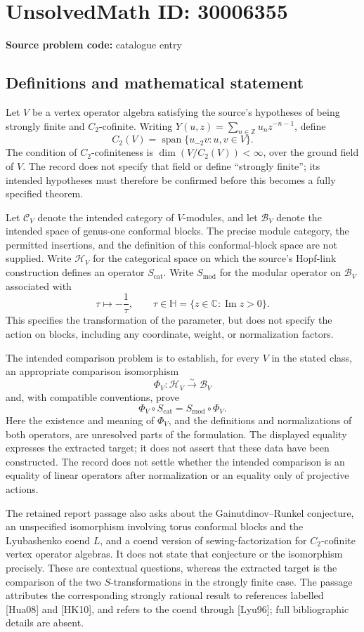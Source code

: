 \documentclass[11pt]{article}
\newcommand{\Z}{\mathbb{Z}}
\newcommand{\C}{\mathbb{C}}
\begin{document}
\section*{UnsolvedMath ID: 30006355}
\textbf{Source problem code:} catalogue entry
\subsection{Definitions and mathematical statement}
Let \(V\) be a vertex operator algebra satisfying the source's hypotheses of being strongly finite and \(C_2\)-cofinite. Writing \(Y(u,z)=\sum_{n\in\Z}u_nz^{-n-1}\), define
\[
C_2(V)=\operatorname{span}\{u_{-2}v:u,v\in V\}.
\]
The condition of \(C_2\)-cofiniteness is \(\dim(V/C_2(V))<\infty\), over the ground field of \(V\). The record does not specify that field or define ``strongly finite''; its intended hypotheses must therefore be confirmed before this becomes a fully specified theorem.

Let \(\mathcal C_V\) denote the intended category of \(V\)-modules, and let \(\mathcal B_V\) denote the intended space of genus-one conformal blocks. The precise module category, the permitted insertions, and the definition of this conformal-block space are not supplied. Write \(\mathcal H_V\) for the categorical space on which the source's Hopf-link construction defines an operator \(S_{\mathrm{cat}}\). Write \(S_{\mathrm{mod}}\) for the modular operator on \(\mathcal B_V\) associated with
\[
\tau\longmapsto-\frac{1}{\tau},\qquad
\tau\in\mathbb H=\{z\in\C:\operatorname{Im}z>0\}.
\]
This specifies the transformation of the parameter, but does not specify the action on blocks, including any coordinate, weight, or normalization factors.

The intended comparison problem is to establish, for every \(V\) in the stated class, an appropriate comparison isomorphism
\[
\Phi_V:\mathcal H_V\xrightarrow{\sim}\mathcal B_V
\]
and, with compatible conventions, prove
\[
\Phi_V\circ S_{\mathrm{cat}}
 =S_{\mathrm{mod}}\circ\Phi_V.
\]
Here the existence and meaning of \(\Phi_V\), and the definitions and normalizations of both operators, are unresolved parts of the formulation. The displayed equality expresses the extracted target; it does not assert that these data have been constructed. The record does not settle whether the intended comparison is an equality of linear operators after normalization or an equality only of projective actions.

The retained report passage also asks about the Gainutdinov--Runkel conjecture, an unspecified isomorphism involving torus conformal blocks and the Lyubashenko coend \(L\), and a coend version of sewing-factorization for \(C_2\)-cofinite vertex operator algebras. It does not state that conjecture or the isomorphism precisely. These are contextual questions, whereas the extracted target is the comparison of the two \(S\)-transformations in the strongly finite case. The passage attributes the corresponding strongly rational result to references labelled [Hua08] and [HK10], and refers to the coend through [Lyu96]; full bibliographic details are absent.
\end{document}
